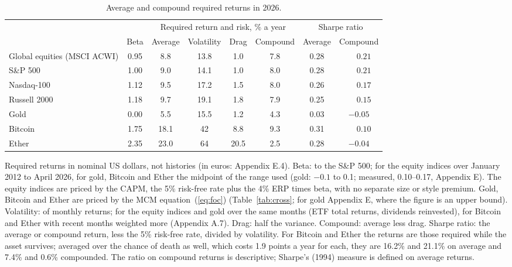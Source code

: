 \documentclass[11pt]{article}
\begin{document}
\begin{table}[ht]\centering\small
\caption{Average and compound required returns in 2026.}
\label{tab:compound}
\setlength{\tabcolsep}{4.5pt}\begin{tabular}{lcccccc@{\hskip 1em}c}
\toprule
 & & \multicolumn{4}{c}{Required return and risk, \% a year} & \multicolumn{2}{c}{Sharpe ratio} \\
\cmidrule(lr){3-6}\cmidrule(lr){7-8}
 & Beta & Average & Volatility & Drag & Compound & Average & Compound \\
\midrule
Global equities (MSCI ACWI) & 0.95 & 8.8 & 13.8 & 1.0 & 7.8 & 0.28 & $\phantom{-}0.21$ \\
S\&P 500 & 1.00 & 9.0 & 14.1 & 1.0 & 8.0 & 0.28 & $\phantom{-}0.21$ \\
Nasdaq-100 & 1.12 & 9.5 & 17.2 & 1.5 & 8.0 & 0.26 & $\phantom{-}0.17$ \\
Russell 2000 & 1.18 & 9.7 & 19.1 & 1.8 & 7.9 & 0.25 & $\phantom{-}0.15$ \\
Gold & 0.00 & 5.5 & 15.5 & 1.2 & 4.3 & 0.03 & $-0.05$ \\
Bitcoin & 1.75 & 18.1 & 42 & 8.8 & 9.3 & 0.31 & $\phantom{-}0.10$ \\
Ether & 2.35 & 23.0 & 64 & 20.5 & 2.5 & 0.28 & $-0.04$ \\
\bottomrule
\end{tabular}
\par\smallskip\begin{minipage}{0.92\textwidth}\footnotesize Required returns in nominal US dollars, not histories (in euros: Appendix E.4). Beta: to the S\&P 500; for the equity indices over January 2012 to April 2026, for gold, Bitcoin and Ether the midpoint of the range used (gold: $-0.1$ to 0.1; measured, 0.10--0.17, Appendix E). The equity indices are priced by the CAPM, the 5\% risk-free rate plus the 4\% ERP times beta, with no separate size or style premium. Gold, Bitcoin and Ether are priced by the MCM equation~(\ref{eq:foc}) (Table~\ref{tab:cross}; for gold Appendix E, where the figure is an upper bound). Volatility: of monthly returns; for the equity indices and gold over the same months (ETF total returns, dividends reinvested), for Bitcoin and Ether with recent months weighted more (Appendix A.7). Drag: half the variance. Compound: average less drag. Sharpe ratio: the average or compound return, less the 5\% risk-free rate, divided by volatility. For Bitcoin and Ether the returns are those required while the asset survives; averaged over the chance of death as well, which costs 1.9 points a year for each, they are 16.2\% and 21.1\% on average and 7.4\% and 0.6\% compounded. The ratio on compound returns is descriptive; Sharpe's (1994) measure is defined on average returns.\end{minipage}
\end{table}
\end{document}
